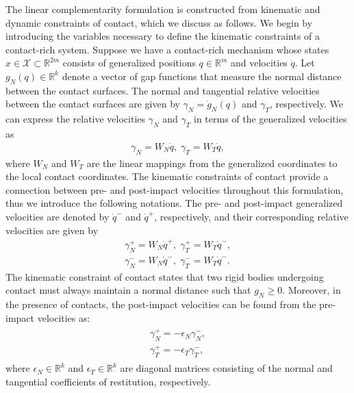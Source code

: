 %
The linear complementarity formulation is constructed from kinematic and dynamic
constraints of contact, which we discuss as follows.
%
We begin by introducing the variables necessary to define the kinematic
constraints of a contact-rich system.
%
Suppose we have a contact-rich mechanism whose states $x \in \mathcal{X} \subset
\mathbb{R}^{2m}$ consists of generalized positions $q \in \mathbb{R}^m$ and
velocities $\dot{q}$.
%
Let $g_N(q) \in \mathbb{R}^{k}$ denote a vector of gap functions that measure
the normal distance between the contact surfaces. 
%
The normal and tangential relative velocities between the contact surfaces are
given by $\gamma_N = \dot{g}_N(q)$ and $\gamma_T$, respectively.
%
We can express the relative velocities $\gamma_N$ and $\gamma_T$ in terms of the
generalized velocities as 
%
\begin{align}
  \gamma_N = W_N \dot{q}, \; \gamma_T = W_T \dot{q},
  \label{eq:gamma}
\end{align}  
\noindent where $W_N$ and $W_T$ are the linear mappings from the generalized
coordinates to the local contact coordinates.
%
The kinematic constraints of contact provide a connection between pre- and
post-impact velocities throughout this formulation, thus we introduce the
following notations.
%
The pre- and post-impact generalized velocities are denoted by $\dot{q}^-$ and
$\dot{q}^+$, respectively, and their corresponding relative velocities are given
by
\begin{align*}
  \gamma_N^+ = W_N\dot{q}^+, \; \gamma_T^+ = W_T\dot{q}^-, \\
  \gamma_N^- = W_N\dot{q}^-, \; \gamma_T^- = W_T\dot{q}^-.
\end{align*}
%
The kinematic constraint of contact states that two rigid bodies undergoing
contact must always maintain a normal distance such that $g_N \geq 0$. Moreover,
in the presence of contacts, the post-impact velocities can be found from the
pre-impact velocities as:
\begin{align}
  \begin{gathered}
    \gamma_N^+ = -\epsilon_N \gamma_N^-, \\
    \gamma_T^+ = -\epsilon_T \gamma_T^-,
  \end{gathered}
  \label{eq:postimpactVel}
\end{align}
\noindent where $\epsilon_N \in \mathbb{R}^k$ and $\epsilon_T \in \mathbb{R}^k$
are diagonal matrices consisting of the normal and tangential coefficients of
restitution, respectively.

